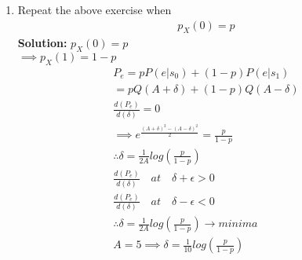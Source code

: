 \documentclass[journal,12pt,twocolumn]{IEEEtran}
\renewcommand\thesection{\arabic{section}}
\theoremstyle{remark}
\newcommand{\solution}{\noindent \textbf{Solution: }}
\numberwithin{equation}{section}
\begin{document}
\begin{enumerate}[label=\thesection.\arabic*
,ref=\thesection.\theenumi]
\solution
Threshold=$\delta$, \\
\begin{align}
 &y>\delta \implies s_1\\
 &y \leq \delta \implies s_0\\
 &p(e|s_1)=\frac{1}{\sqrt{2 \pi}} \int_{-\infty}^{\delta} e^{-\frac{(y-A)^{2}}{2}} dy\\
 \nonumber
 &p(e|s_0)=\frac{1}{\sqrt{2 \pi}} \int_{\delta}^{\infty} e^{-\frac{(y+A)^{2}}{2}} dy\\
\nonumber
&P_e=\frac{1}{2\sqrt{2 \pi}}{( \int_{-\infty}^{\delta} e^{-\frac{(y-A)^{2}}{2}}dy+ \int_{\delta}^{\infty} e^{-\frac{(y+A)^{2}}{2}} dy)}\\
&P_e=\frac{Q(\delta+A)+Q(A-\delta)}{2}\\
&P_e=f(\delta)\\
&\text{to minimize} P_e, \frac{d(f(\delta))}{d\delta}=0 ~\text{and} f"(\delta)>0\\
&e^{\frac{-(A-\delta)^{2}}{2}}-e^{\frac{-(A+\delta)^{2}}{2}}=0\\
&\therefore A-\delta=A+\delta, \implies \delta=0\\
&f"(\delta)=k((A-\delta)e^{\frac{-(A-\delta)^{2}}{2}}+(A+\delta)e^{\frac{-(A+\delta)^{2}}{2}})>0
\end{align}
\item Repeat the above exercise when 
	\begin{align}
		p_{X}(0) = p
	\end{align}
\solution
 $p_{X}(0)=p$ \\
 $\implies p_{X}(1)=1-p$
 \begin{align}
 P_{e}=p P(e|s_0)+(1-p)P(e|s_1)\\
 =p Q(A+\delta)+(1-p)Q(A-\delta)\\
 \frac{d(P_{e})}{d(\delta)}=0\\
 \implies e^\frac{(A+\delta)^{2}-(A-\delta)^{2}}{2}=\frac{p}{1-p}\\
 \therefore \delta=\frac{1}{2A}log(\frac{p}{1-p})\\
  \frac{d(P_{e})}{d(\delta)}\quad at \quad \delta+\epsilon>0 \\
  \nonumber
   \frac{d(P_{e})}{d(\delta)} \quad at\quad \delta-\epsilon<0 \\
   \nonumber
   \therefore \delta=\frac{1}{2A}log\left(\frac{p}{1-p}\right)\longrightarrow   minima\\
   A=5 \implies \delta=\frac{1}{10}log\left(\frac{p}{1-p}\right)
 \end{align}
 \\

\end{enumerate}
\end{document}
